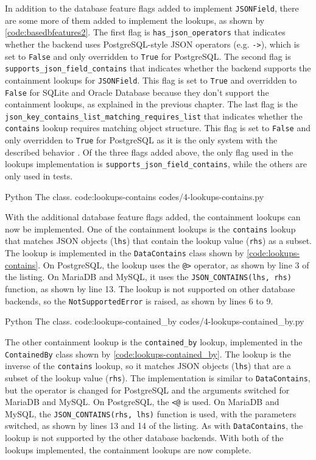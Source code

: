 In addition to the database feature flags added to implement \verb|JSONField|,
there are some more of them added to implement the lookups, as shown by
\autoref{code:basedbfeatures2}. The first flag is \verb|has_json_operators|
that indicates whether the backend uses PostgreSQL-style JSON operators (e.g.
\verb|->|), which is set to \verb|False| and only overridden to \verb|True| for
PostgreSQL. The second flag is \verb|supports_json_field_contains| that
indicates whether the backend supports the containment lookups for
\verb|JSONField|. This flag is set to \verb|True| and overridden to
\verb|False| for SQLite and Oracle Database because they don't support the
containment lookups, as explained in the previous chapter. The last flag is the
\verb|json_key_contains_list_matching_requires_list| that indicates whether the
\verb|contains| lookup requires matching object structure. This flag is set
to \verb|False| and only overridden to \verb|True| for PostgreSQL as it is the
only system with the described behavior \cite{postgres:json}. Of the three
flags added above, the only flag used in the lookups implementation is
\verb|supports_json_field_contains|, while the others are only used in tests.

\listing
{Python}
{The  class.}
{code:lookups-contains}
{codes/4-lookups-contains.py}

With the additional database feature flags added, the containment lookups can
now be implemented. One of the containment lookups is the \verb|contains|
lookup that matches JSON objects (\verb|lhs|) that contain the lookup value
(\verb|rhs|) as a subset. The lookup is implemented in the \verb|DataContains|
class shown by \autoref{code:lookups-contains}. On PostgreSQL, the lookup uses
the \verb|@>| operator, as shown by line 3 of the listing. On MariaDB and
MySQL, it uses the \verb|JSON_CONTAINS(lhs, rhs)| function, as shown by line
13. The lookup is not supported on other database backends, so the
\verb|NotSupportedError| is raised, as shown by lines 6 to 9.

\listing
{Python}
{The  class.}
{code:lookups-contained_by}
{codes/4-lookups-contained_by.py}

The other containment lookup is the \verb|contained_by| lookup, implemented in
the \verb|ContainedBy| class shown by \autoref{code:lookups-contained_by}. The
lookup is the inverse of the \verb|contains| lookup, so it matches JSON objects
(\verb|lhs|) that are a subset of the lookup value (\verb|rhs|). The
implementation is similar to \verb|DataContains|, but the operator is changed
for PostgreSQL and the arguments switched for MariaDB and MySQL. On PostgreSQL,
the \verb|<@| is used. On MariaDB and MySQL, the \verb|JSON_CONTAINS(rhs, lhs)|
function is used, with the parameters switched, as shown by lines 13 and 14 of
the listing. As with \verb|DataContains|, the lookup is not supported by the
other database backends. With both of the lookups implemented, the containment
lookups are now complete.

